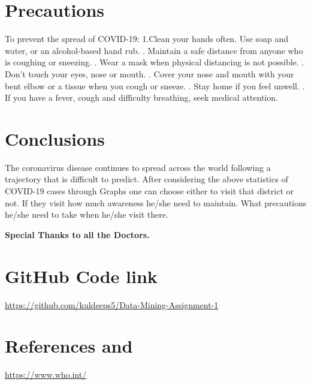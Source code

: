 \documentclass{report}
\begin{document}
\newpage
\section{Precautions}
\justify To prevent the spread of COVID-19: \newline
1.Clean your hands often. Use soap and water, or an alcohol-based hand rub. . Maintain a safe distance from anyone who is coughing or sneezing. . Wear a mask when physical distancing is not possible. . Don’t touch your eyes, nose or mouth. . Cover your nose and mouth with your bent elbow or a tissue when you cough or sneeze. . Stay home if you feel unwell. . If you have a fever, cough and difficulty breathing, seek medical attention. \newline

\section{Conclusions}
\justify The coronavirus disease continues to spread across the world following a trajectory that is difficult to predict. After considering the above statistics of COVID-19 cases through Graphs one can choose either to visit that district or not. If they visit how much awareness he/she need to maintain. What precautions he/she need to take when he/she visit there.
\newline \centerline{\textbf{Special Thanks to all the Doctors.}}
\section{GitHub Code link}
\href{https://github.com/kuldeeps5/Data-Mining-Assignment-1}{https://github.com/kuldeeps5/Data-Mining-Assignment-1}
\section{References and}
\href{https://www.who.int/emergencies/diseases/novel-coronavirus-2019/advice-for-public}{https://www.who.int/}
\end{document}
